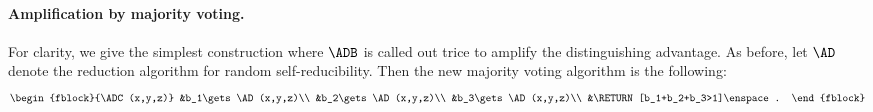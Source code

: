 \documentclass{crypto-exercise}
\begin{document}
\begin{solution}
\paragraph{Amplification by majority voting.} 
For clarity, we give the simplest construction where $\ADB$ is called out trice to amplify the distinguishing advantage. 
As before, let $\AD$ denote the reduction algorithm for random self-reducibility. 
Then the new majority voting algorithm is the following:
\begin{align*}
    \begin{fblock}{\ADC(x,y,z)}
      &b_1\gets\AD(x,y,z)\\
      &b_2\gets\AD(x,y,z)\\
      &b_3\gets\AD(x,y,z)\\
      &\RETURN [b_1+b_2+b_3>1]\enspace.
    \end{fblock}
\end{align*}
  

\end{solution}
\end{document}
